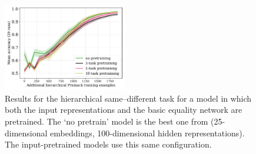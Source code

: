 \begin{figure}[H]
  \centering
  \includegraphics[width=0.48\textwidth]{../fig/input-as-output-pretrain-compare-train_size-pretrained-embed_dim=None.pdf}
  \caption{Results for the hierarchical same--different task for a model in which both the input representations and the basic equality network are pretrained. The `no pretrain' model is the best one from  (25-dimensional embeddings, 100-dimensional hidden representations). The input-pretrained models use this same configuration.}
  \label{fig:double-pretrain}
\end{figure}


